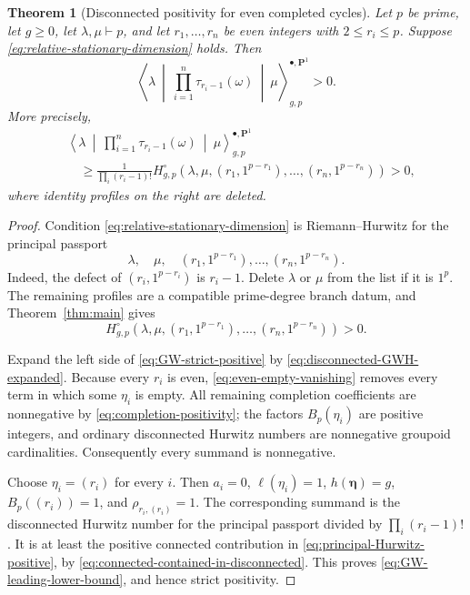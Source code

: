 \documentclass[11pt]{amsart}
\theoremstyle{plain}
\newtheorem{theorem}{Theorem}[section]
\theoremstyle{definition}
\numberwithin{equation}{section}
\begin{document}
\begin{theorem}[Disconnected positivity for even completed cycles]
\label{thm:GW-positive-sector}
Let $p$ be prime, let $g\geq0$, let $\lambda,\mu\vdash p$, and let
$r_1,\ldots,r_n$ be even integers with $2\leq r_i\leq p$.  Suppose
\eqref{eq:relative-stationary-dimension} holds.  Then
\begin{equation}\label{eq:GW-strict-positive}
 \left\langle\lambda\ \middle|\
   \prod_{i=1}^n\tau_{r_i-1}(\omega)\
   \middle|\ \mu\right\rangle^{\bullet,\mathbf P^1}_{g,p}>0.
\end{equation}
More precisely,
\begin{align}
&\left\langle\lambda\ \middle|\
   \prod_{i=1}^n\tau_{r_i-1}(\omega)\
   \middle|\ \mu\right\rangle^{\bullet,\mathbf P^1}_{g,p}
\label{eq:GW-leading-lower-bound}\\
&\quad\geq
 \frac1{\prod_i(r_i-1)!}
 H^\circ_{g,p}
 \left(\lambda,\mu,
 (r_1,1^{p-r_1}),\ldots,(r_n,1^{p-r_n})\right)>0,
\nonumber
\end{align}
where identity profiles on the right are deleted.
\end{theorem}

\begin{proof}
Condition \eqref{eq:relative-stationary-dimension} is Riemann--Hurwitz for
the principal passport
\begin{equation}\label{eq:principal-GW-passport}
 \lambda,\quad\mu,\quad
 (r_1,1^{p-r_1}),\ldots,(r_n,1^{p-r_n}).
\end{equation}
Indeed, the defect of $(r_i,1^{p-r_i})$ is $r_i-1$.  Delete $\lambda$ or
$\mu$ from the list if it is $1^p$.  The remaining profiles are a compatible
prime-degree branch datum, and Theorem~\ref{thm:main} gives
\begin{equation}\label{eq:principal-Hurwitz-positive}
 H^\circ_{g,p}
 \left(\lambda,\mu,
 (r_1,1^{p-r_1}),\ldots,(r_n,1^{p-r_n})\right)>0.
\end{equation}

Expand the left side of \eqref{eq:GW-strict-positive} by
\eqref{eq:disconnected-GWH-expanded}.  Because every $r_i$ is even,
\eqref{eq:even-empty-vanishing} removes every term in which some
$\eta_i$ is empty.  All remaining completion coefficients are nonnegative
by \eqref{eq:completion-positivity}; the factors $B_p(\eta_i)$ are positive
integers, and ordinary disconnected Hurwitz numbers are nonnegative
groupoid cardinalities.  Consequently every summand is nonnegative.

Choose $\eta_i=(r_i)$ for every $i$.  Then $a_i=0$,
$\ell(\eta_i)=1$, $h(\boldsymbol\eta)=g$,
$B_p((r_i))=1$, and $\rho_{r_i,(r_i)}=1$.  The corresponding summand is the
disconnected Hurwitz number for the principal passport divided by
$\prod_i(r_i-1)!$.  It is at least the positive connected contribution in
\eqref{eq:principal-Hurwitz-positive}, by
\eqref{eq:connected-contained-in-disconnected}.  This proves
\eqref{eq:GW-leading-lower-bound}, and hence strict positivity.
\end{proof}
\end{document}

